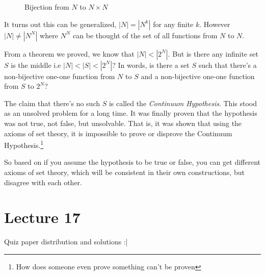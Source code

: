 \documentclass[a4paper,10pt]{article}
\theoremstyle{definition} %
\begin{document}
    \begin{figure}[ht]
    \centering
    \captionsetup{justification=centering}  %
    \caption{Bijection from $N$ to $N \times N$}
    \end{figure}
    
    It turns out this can be generalized, $|N| = |N^k|$ for any finite $k$. However
    $|N| \neq |N^N|$ where $N^N$ can be thought of the set of all functions from $N$
    to $N$.

    From a theorem we proved, we know that $|N| < |2^N|$. But is there any infinite set
    $S$ is the middle i.e $|N| < |S| < |2^N|$? In words, is there a set $S$ such that there's 
    a non-bijective one-one function from $N$ to $S$ and a non-bijective one-one function
    from $S$ to $2^N$?

    The claim that there's no such $S$ is called the \emph{Continuum Hypothesis}. This 
    stood as an unsolved problem for a long time. It was finally proven that the hypothesis 
    was not true, not false, but unsolvable. That is, it was shown that using the axioms of set
    theory, it is impossible to prove or disprove the Continuum Hypothesis.\footnote{
    How does someone even prove something can't be proven
    }

    So based on if you assume the hypothesis to be true or false, you can get different
    axioms of set theory, which will be consistent in their own constructions, but 
    disagree with each other.

    \section{Lecture 17}

    Quiz paper distribution and solutions :|
\end{document}
